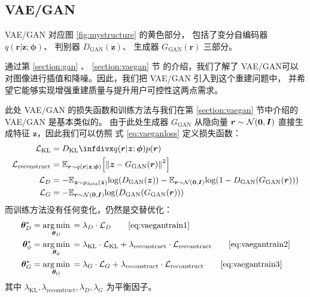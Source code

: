 \subsection{VAE/GAN}
VAE/GAN 对应图 \ref{fig:mystructure} 的黄色部分，
包括了变分自编码器 $q(\bm r | \bm z; \bm\phi)$、
判别器 $D_{\text{GAN}}(\bm z)$、
生成器 $G_{\text{GAN}}(\bm r)$ 三部分。

通过第 \ref{section:gan} 、 \ref{section:vaegan} 节 的介绍，我们了解了 VAE/GAN\cite{vaegan}可以对图像进行插值和降噪。因此，我们把 VAE/GAN 引入到这个重建问题中，
并希望它能够实现增强重建质量与提升用户可控性这两点需求。%

此处 VAE/GAN 的损失函数和训练方法与我们在第 \ref{section:vaegan} 节中介绍的 VAE/GAN 是基本类似的。
由于此处生成器 $G_{\text{GAN}}$ 从隐向量 $\bm r \sim \mathcal{N}(\bm0, \bm I)$ 直接生成特征 $\bm z$，因此我们可以仿照 式 \eqref{eq:vaeganloss} 定义损失函数：
\begin{subequations}
	\label{eq:myvaeganloss}
	\begin{align}
		\Loss_{\text{KL}}          & = \DKL{q(\bm r | \bm z; \bm\phi)}{p(\bm r)}
		\\
		\Loss_{\text{reconstruct}} & = \EXPECT{\bm r\sim q(\bm r | \bm z; \bm \phi)}{\left[\Norm*{\bm z - G_{\text{GAN}}(\bm r)}^2\right]}
		\\
		\Loss_D                    & =
		- \EXPECT{\bm z \sim \PDATA(\bm z)}           \log(    D_{\text{GAN}}(\bm z))
		- \EXPECT{\bm r \sim \NormDist(\bm 0, \bm I)} \log(1 - D_{\text{GAN}}( G_{\text{GAN}}(\bm r)))
		\\
		\Loss_G                    & =
		- \EXPECT{\bm r \sim \NormDist(\bm 0, \bm I)} \log(D_{\text{GAN}}( G_{\text{GAN}}(\bm r)))
	\end{align}
\end{subequations}
而训练方法没有任何变化，仍然是交替优化：
\begin{subequations}
	\begin{align}
		\bm\theta_D^*    & = \argmin{\bm\theta_D} = \lambda_D \cdot \Loss_D \tag*{\ref{eq:vaegantrain1}}
		\\
		\bm\theta_\phi^* & = \argmin{\bm\theta_\phi} =
		\lambda_{\text{KL}} \cdot \Loss_{\text{KL}} +
		\lambda_{\text{reconstruct}} \cdot \Loss_{\text{reconstruct}} \tag*{\ref{eq:vaegantrain2}}
		\\
		\bm\theta_G^*    & = \argmin{\bm\theta_G} =
		\lambda_G \cdot \Loss_G +
		\lambda_{\text{reconstruct}} \cdot \Loss_{\text{reconstruct}} \tag*{\ref{eq:vaegantrain3}}
	\end{align}
\end{subequations}
其中 $\lambda_{\text{KL}}, \lambda_{\text{reconstruct}}, \lambda_D, \lambda_G$ 为平衡因子。

